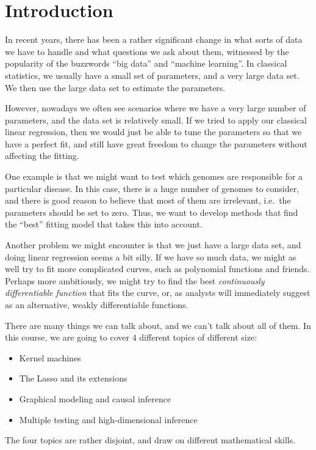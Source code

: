 \documentclass[a4paper]{article}
\begin{document}
\section{Introduction}
In recent years, there has been a rather significant change in what sorts of data we have to handle and what questions we ask about them, witnessed by the popularity of the buzzwords ``big data'' and ``machine learning''. In classical statistics, we usually have a small set of parameters, and a very large data set. We then use the large data set to estimate the parameters.

However, nowadays we often see scenarios where we have a very large number of parameters, and the data set is relatively small. If we tried to apply our classical linear regression, then we would just be able to tune the parameters so that we have a perfect fit, and still have great freedom to change the parameters without affecting the fitting.

One example is that we might want to test which genomes are responsible for a particular disease. In this case, there is a huge number of genomes to consider, and there is good reason to believe that most of them are irrelevant, i.e.\ the parameters should be set to zero. Thus, we want to develop methods that find the ``best'' fitting model that takes this into account.

Another problem we might encounter is that we just have a large data set, and doing linear regression seems a bit silly. If we have so much data, we might as well try to fit more complicated curves, such as polynomial functions and friends. Perhaps more ambitiously, we might try to find the best \emph{continuously differentiable function} that fits the curve, or, as analysts will immediately suggest as an alternative, weakly differentiable functions.

There are many things we can talk about, and we can't talk about all of them. In this course, we are going to cover $4$ different topics of different size:
\begin{itemize}
  \item Kernel machines
  \item The Lasso and its extensions
  \item Graphical modeling and causal inference
  \item Multiple testing and high-dimensional inference
\end{itemize}
The four topics are rather disjoint, and draw on different mathematical skills.
\end{document}

